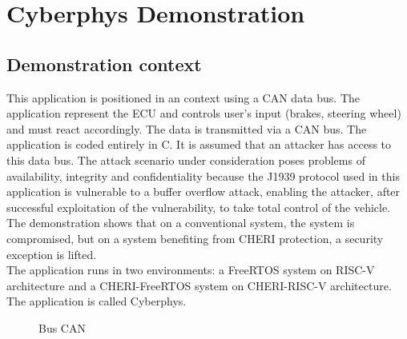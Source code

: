 \documentclass[a4paper, 11pt]{article}
\begin{document}
\section{Cyberphys Demonstration}
\subsection{Demonstration context}
This application is positioned in an  context using a CAN data bus. The application represent the ECU and controls user's input (brakes, steering wheel) and must react accordingly. The data is transmitted via a CAN bus.
The application is coded entirely in C.
It is assumed that an attacker has access to this data bus. The attack scenario under consideration poses problems of availability, integrity and confidentiality because the J1939 protocol used in this application is vulnerable to a buffer overflow attack, enabling the attacker, after successful exploitation of the vulnerability, to take total control of the vehicle. The demonstration shows that on a conventional system, the system is compromised, but on a system benefiting from CHERI protection, a security exception is lifted. \\
The application runs in two environments: a FreeRTOS system on RISC-V architecture and a CHERI-FreeRTOS system on CHERI-RISC-V architecture. The application is called Cyberphys.
\begin{figure}
        \begin{center}
        \end{center}
        \caption{Bus CAN} 
		\label{fig:canbus}

\end{figure}
\end{document}
